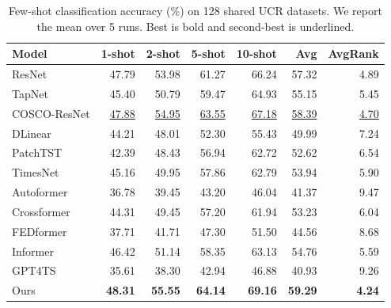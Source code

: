 \begin{table}[t]
\centering
\caption{Few-shot classification accuracy (\%) on 128 shared UCR datasets. We report the mean over 5 runs. Best is bold and second-best is underlined.}
\label{tab:ucr_fewshot_paper_current-fewshot-main}
\begin{tabular}{lrrrrrr}
\toprule
Model & 1-shot & 2-shot & 5-shot & 10-shot & Avg & AvgRank \\
\midrule
ResNet & 47.79 & 53.98 & 61.27 & 66.24 & 57.32 & 4.89 \\
TapNet & 45.40 & 50.79 & 59.47 & 64.93 & 55.15 & 5.45 \\
COSCO-ResNet & \underline{47.88} & \underline{54.95} & \underline{63.55} & \underline{67.18} & \underline{58.39} & \underline{4.70} \\
DLinear & 44.21 & 48.01 & 52.30 & 55.43 & 49.99 & 7.24 \\
PatchTST & 42.39 & 48.43 & 56.94 & 62.72 & 52.62 & 6.54 \\
TimesNet & 45.16 & 49.95 & 57.86 & 62.79 & 53.94 & 5.90 \\
Autoformer & 36.78 & 39.45 & 43.20 & 46.04 & 41.37 & 9.47 \\
Crossformer & 44.31 & 49.45 & 57.20 & 61.94 & 53.23 & 6.04 \\
FEDformer & 37.71 & 41.71 & 47.30 & 51.50 & 44.56 & 8.68 \\
Informer & 46.42 & 51.14 & 58.35 & 63.13 & 54.76 & 5.59 \\
GPT4TS & 35.61 & 38.30 & 42.94 & 46.88 & 40.93 & 9.26 \\
Ours & \textbf{48.31} & \textbf{55.55} & \textbf{64.14} & \textbf{69.16} & \textbf{59.29} & \textbf{4.24} \\
\bottomrule
\end{tabular}
\end{table}
